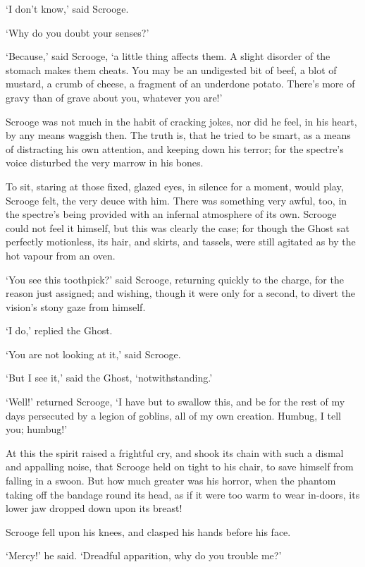 \documentclass[11pt,twoside]{article}\makeatletter
\begin{document}
‘I don't know,’ said Scrooge.\par
‘Why do you doubt your senses?’\par
‘Because,’ said Scrooge, ‘a little thing affects them. A slight disorder of the stomach makes them cheats. You may be an undigested bit of beef, a blot of mustard, a crumb of cheese, a fragment of an underdone potato. There's more of gravy than of grave about you, whatever you are!’\par
Scrooge was not much in the habit of cracking jokes, nor did he feel, in his heart, by any means waggish then. The truth is, that he tried to be smart, as a means of distracting his own attention, and keeping down his terror; for the spectre's voice disturbed the very marrow in his bones.\par
To sit, staring at those fixed, glazed eyes, in silence for a moment, would play, Scrooge felt, the very deuce with him. There was something very awful, too, in the spectre's being provided with an infernal atmosphere of its own. Scrooge could not feel it himself, but this was clearly the case; for though the Ghost sat perfectly motionless, its hair, and skirts, and tassels, were still agitated as by the hot vapour from an oven. \par
‘You see this toothpick?’ said Scrooge, returning quickly to the charge, for the reason just assigned; and wishing, though it were only for a second, to divert the vision's stony gaze from himself.\par
‘I do,’ replied the Ghost.\par
‘You are not looking at it,’ said Scrooge.\par
‘But I see it,’ said the Ghost, ‘notwithstanding.’\par
‘Well!’ returned Scrooge, ‘I have but to swallow this, and be for the rest of my days persecuted by a legion of goblins, all of my own creation. Humbug, I tell you; humbug!’\par
At this the spirit raised a frightful cry, and shook its chain with such a dismal and appalling noise, that Scrooge held on tight to his chair, to save himself from falling in a swoon. But how much greater was his horror, when the phantom taking off the bandage round its head, as if it were too warm to wear in-doors, its lower jaw dropped down upon its breast! \par
Scrooge fell upon his knees, and clasped his hands before his face. \par
‘Mercy!’ he said. ‘Dreadful apparition, why do you trouble me?’\par
\end{document}
